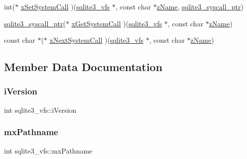 \begin{DoxyCompactItemize}
int($\ast$ \mbox{\hyperlink{structsqlite3__vfs_a444cd80f79ea4994f72551bb9f403866}{x\+Set\+System\+Call}} )(\mbox{\hyperlink{structsqlite3__vfs}{sqlite3\+\_\+vfs}} $\ast$, const char $\ast$\mbox{\hyperlink{structsqlite3__vfs_a0f06a27ac2201ea04c0623ef19e5d73e}{z\+Name}}, \mbox{\hyperlink{sqlite3_8h_a99a6393e96d7095fa024de9c1257aa6f}{sqlite3\+\_\+syscall\+\_\+ptr}})
\item 
\mbox{\hyperlink{sqlite3_8h_a99a6393e96d7095fa024de9c1257aa6f}{sqlite3\+\_\+syscall\+\_\+ptr}}($\ast$ \mbox{\hyperlink{structsqlite3__vfs_a1bf78a1603ab605cd92d146e3f810727}{x\+Get\+System\+Call}} )(\mbox{\hyperlink{structsqlite3__vfs}{sqlite3\+\_\+vfs}} $\ast$, const char $\ast$\mbox{\hyperlink{structsqlite3__vfs_a0f06a27ac2201ea04c0623ef19e5d73e}{z\+Name}})
\item 
const char $\ast$($\ast$ \mbox{\hyperlink{structsqlite3__vfs_afbd158883d9bb7954fa7ecd595fe3c2b}{x\+Next\+System\+Call}} )(\mbox{\hyperlink{structsqlite3__vfs}{sqlite3\+\_\+vfs}} $\ast$, const char $\ast$\mbox{\hyperlink{structsqlite3__vfs_a0f06a27ac2201ea04c0623ef19e5d73e}{z\+Name}})
\end{DoxyCompactItemize}


\subsection{Member Data Documentation}
\mbox{\label{structsqlite3__vfs_a694dd264949bd163545fe174510ed019}} 
\subsubsection{\texorpdfstring{iVersion}{iVersion}}
{\footnotesize\ttfamily int sqlite3\+\_\+vfs\+::i\+Version}

\mbox{\label{structsqlite3__vfs_adb2d82c74891b00b5529fb94e7710135}} 
\subsubsection{\texorpdfstring{mxPathname}{mxPathname}}
{\footnotesize\ttfamily int sqlite3\+\_\+vfs\+::mx\+Pathname}

\mbox{\label{structsqlite3__vfs_a1ba832cf207fe59c1fc8eb436524bc35}} 

